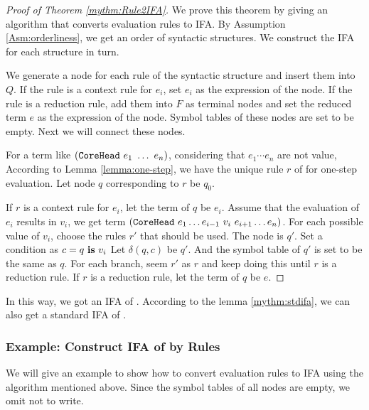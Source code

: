 \begin{proof}[Proof of Theorem \ref{mythm:Rule2IFA}]

We prove this theorem by giving an algorithm that converts evaluation rules to IFA. By Assumption \ref{Asm:orderliness}, we get an order of syntactic structures. We construct the IFA for each structure in turn.

We generate a node for each rule of the syntactic structure  and insert them into $Q$. If the rule is a context rule for $e_i$, set $e_i$ as the expression of the node. If the rule is a reduction rule, add them into $F$ as terminal nodes and set the reduced term $e$ as the expression of the node. Symbol tables of these nodes are set to be empty. Next we will connect these nodes.

For a term like $(\mbox{\tt CoreHead}~e_1~\ldots~e_n)$, considering that $e_1\cdots e_n$ are not value, According to Lemma \ref{lemma:one-step}, we have the unique rule $r$ of  for one-step evaluation. Let node $q$ corresponding to $r$ be $q_0$.

If $r$ is a context rule for $e_i$, let the term of $q$ be $e_i$. Assume that the evaluation of $e_i$ results in $v_i$, we get term $(\mbox{\tt CoreHead}~e_1 \ldots e_{i-1}~v_i~e_{i+1} \ldots e_n)$. For each possible value of $v_i$, choose the rules $r'$ that should be used. The node is $q'$. Set a condition as $c=q~\mbox{\rm \bf is}~v_i$ Let $\delta(q, c)$ be $q'$. And the symbol table of $q'$ is set to be the same as $q$. For each branch, seem $r'$ as $r$ and keep doing this until $r$ is a reduction rule. If $r$ is a reduction rule, let the term of $q$ be $e$.


\end{proof}

In this way, we got an IFA of . According to the lemma \ref{mythm:stdifa}, we can also get a standard IFA of .

\subsubsection{Example: Construct IFA of  by Rules}

We will give an example to show how to convert evaluation rules to IFA using the algorithm mentioned above. Since the symbol tables of all nodes are empty, we omit not to write.

